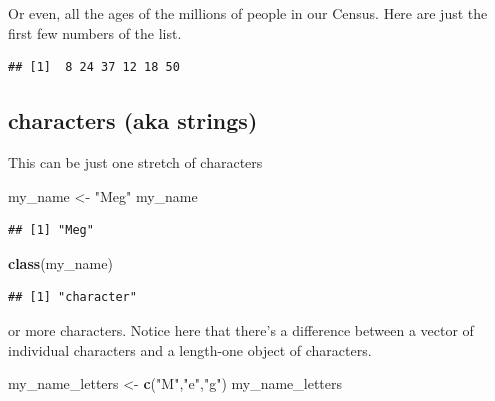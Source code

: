\documentclass[
]{book}
\newenvironment{Shaded}{\begin{snugshade}}{\end{snugshade}}
\newcommand{\KeywordTok}[1]{\textcolor[rgb]{0.13,0.29,0.53}{\textbf{#1}}}
\newcommand{\NormalTok}[1]{#1}
\newcommand{\OperatorTok}[1]{\textcolor[rgb]{0.81,0.36,0.00}{\textbf{#1}}}
\newcommand{\StringTok}[1]{\textcolor[rgb]{0.31,0.60,0.02}{#1}}
\theoremstyle{definition}
\theoremstyle{definition}
\theoremstyle{definition}
\theoremstyle{remark}
\begin{document}
Or even, all the ages of the millions of people in our Census. Here are just the first few numbers of the list.

\begin{Shaded}
\end{Shaded}

\begin{verbatim}
## [1]  8 24 37 12 18 50
\end{verbatim}

\hypertarget{characters-aka-strings}{%
\subsection{characters (aka strings)}\label{characters-aka-strings}}

This can be just one stretch of characters

\begin{Shaded}
\begin{Highlighting}[]
\NormalTok{my\_name <{-}}\StringTok{ "Meg"}
\NormalTok{my\_name}
\end{Highlighting}
\end{Shaded}

\begin{verbatim}
## [1] "Meg"
\end{verbatim}

\begin{Shaded}
\begin{Highlighting}[]
\KeywordTok{class}\NormalTok{(my\_name)}
\end{Highlighting}
\end{Shaded}

\begin{verbatim}
## [1] "character"
\end{verbatim}

or more characters. Notice here that there's a difference between a vector of individual characters and a length-one object of characters.

\begin{Shaded}
\begin{Highlighting}[]
\NormalTok{my\_name\_letters <{-}}\StringTok{  }\KeywordTok{c}\NormalTok{(}\StringTok{"M"}\NormalTok{,}\StringTok{"e"}\NormalTok{,}\StringTok{"g"}\NormalTok{)}
\NormalTok{my\_name\_letters}
\end{Highlighting}
\end{Shaded}
\end{document}
